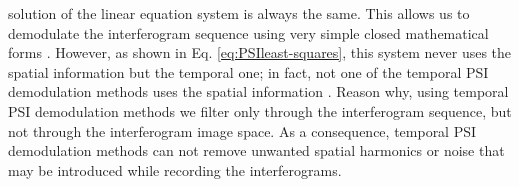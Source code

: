 solution of the linear equation system is always the same. This
allows us to demodulate the interferogram sequence using very simple
closed mathematical forms \cite{Malacara}. However, as shown in
Eq. \eqref{eq:PSIleast-squares}, this system never uses the spatial
information but the temporal one; in fact, not one of the temporal PSI
demodulation methods uses the spatial information \cite{GeneralTheory}. Reason
why, using temporal PSI demodulation methods we filter only through the 
interferogram sequence, but not through the interferogram image space. As a 
consequence, temporal PSI demodulation methods can not remove unwanted spatial
harmonics or noise that may be introduced while recording the interferograms.












